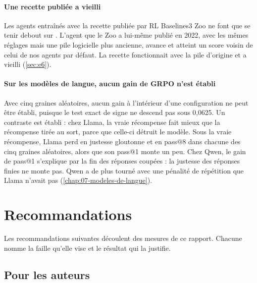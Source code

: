 \paragraph{Une recette publiée a vieilli} Les agents entraînés avec la recette publiée par RL Baselines3 Zoo ne font que se tenir debout sur
. L'agent que le Zoo a lui-même publié en 2022, avec les mêmes réglages mais une pile
logicielle plus ancienne, avance et atteint un score voisin de celui de nos agents par défaut. La
recette fonctionnait avec la pile d'origine et a vieilli (\cref{sec:e6}).

\paragraph{Sur les modèles de langue, aucun gain de GRPO n'est établi} Avec cinq graines aléatoires, aucun gain à l'intérieur
d'une configuration ne peut être établi, puisque le test exact de signe ne descend pas sous 0,0625.
Un contraste est établi : chez Llama, la vraie récompense fait mieux que la récompense tirée au sort,
parce que celle-ci détruit le modèle. Sous la vraie récompense, Llama perd en justesse gloutonne et en
pass@8 dans chacune des cinq graines aléatoires, alors que son pass@1 monte un peu. Chez Qwen, le gain
de pass@1 s'explique par la fin des réponses coupées : la justesse des réponses finies ne monte pas.
Qwen a de plus tourné avec une pénalité de répétition que Llama n'avait pas
(\cref{chap:07-modeles-de-langue}). 

\section{Recommandations}
\label{sec:recommandations}

Les recommandations suivantes découlent des mesures de ce rapport. Chacune nomme la faille qu'elle
vise et le résultat qui la justifie.

\subsection{Pour les auteurs}

